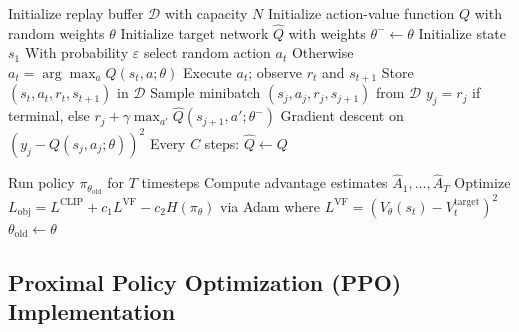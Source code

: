\documentclass{article}
\begin{document}
\begin{algorithm}[t]
\caption{Deep Q-Network with Experience Replay}
\label{alg:dqn}
\begin{algorithmic}[1]
\STATE Initialize replay buffer $\mathcal{D}$ with capacity $N$
\STATE Initialize action-value function $Q$ with random weights $\theta$
\STATE Initialize target network $\hat{Q}$ with weights $\theta^- \leftarrow \theta$
    \STATE Initialize state $s_1$
        \STATE With probability $\varepsilon$ select random action $a_t$
        \STATE Otherwise $a_t = \arg\max_a Q(s_t, a; \theta)$
        \STATE Execute $a_t$; observe $r_t$ and $s_{t+1}$
        \STATE Store $(s_t, a_t, r_t, s_{t+1})$ in $\mathcal{D}$
        \STATE Sample minibatch $(s_j, a_j, r_j, s_{j+1})$ from $\mathcal{D}$
        \STATE $y_j \!=\! r_j$ if terminal, else
               $r_j + \gamma \max_{a'} \hat{Q}(s_{j+1}, a'; \theta^-)$
        \STATE Gradient descent on $(y_j - Q(s_j, a_j; \theta))^2$
        \STATE Every $C$ steps: $\hat{Q} \leftarrow Q$
    \ENDFOR
\ENDFOR
\end{algorithmic}
\end{algorithm}

\begin{algorithm}[t]
\caption{Proximal Policy Optimization with Clipped Objective}
\label{alg:ppo}
\begin{algorithmic}[1]
        \STATE Run policy $\pi_{\theta_\text{old}}$ for $T$ timesteps
        \STATE Compute advantage estimates $\hat{A}_1, \ldots, \hat{A}_T$
    \ENDFOR
    \STATE Optimize $L_\text{obj} = L^\text{CLIP} + c_1 L^\text{VF}
           - c_2 H(\pi_\theta)$ via Adam
    \STATE \quad where $L^\text{VF} = (V_\theta(s_t) - V_t^\text{target})^2$
    \STATE $\theta_\text{old} \leftarrow \theta$
\ENDFOR
\end{algorithmic}
\end{algorithm}

\subsection{Proximal Policy Optimization (PPO) Implementation}
\end{document}
